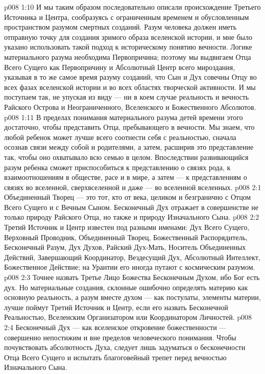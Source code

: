 \vs p008 1:10 \pc И мы таким образом последовательно описали происхождение Третьего Источника и Центра, сообразуясь с ограниченным временем и обусловленным пространством разумом смертных созданий. Разум человека должен иметь отправную точку для создания зримого образа вселенской истории, и мне было указано использовать такой подход к историческому понятию вечности. Логике материального разума необходима Первопричина; поэтому мы выдвигаем Отца Всего Сущего как Первопричину и Абсолютный Центр всего мироздания, указывая в то же самое время разуму созданий, что Сын и Дух совечны Отцу во всех фазах вселенской истории и во всех областях творческой активности. И мы поступаем так, не упуская из виду --- ни в коем случае реальность и вечность Райского Острова и Неограниченного, Вселенского и Божественного Абсолютов.
\vs p008 1:11 В пределах понимания материального разума детей времени этого достаточно, чтобы представить Отца, пребывающего в вечности. Мы знаем, что любой ребенок может лучше всего соотнести себя с реальностью, сначала осознав связи между собой и родителями, а затем, расширив это представление так, чтобы оно охватывало всю семью в целом. Впоследствии развивающийся разум ребенка сможет приспособиться к представлению о связях рода, к взаимоотношениям в обществе, расе и в мире, а затем --- к представлениям о связях во вселенной, сверхвселенной и даже --- во вселенной вселенных.
\vs p008 2:1 Объединенный Творец --- это тот, кто от века, целиком и безгранично с Отцом Всего Сущего и с Вечным Сыном. Бесконечный Дух отражает в совершенстве не только природу Райского Отца, но также и природу Изначального Сына.
\vs p008 2:2 \pc Третий Источник и Центр известен под разными именами: Дух Всего Сущего, Верховный Проводник, Объединенный Творец, Божественный Распорядитель, Бесконечный Разум, Дух Духов, Райский Дух\hyp{}Мать, Носитель Объединенных Действий, Завершающий Координатор, Вездесущий Дух, Абсолютный Интеллект, Божественное Действие; на Урантии его иногда путают с космическим разумом.
\vs p008 2:3 Точнее назвать Третье Лицо Божества Бесконечным Духом, ибо Бог есть дух. Но материальные создания, склонные ошибочно определять материю как основную реальность, а разум вместе духом --- как постулаты, элементы материи, лучше поймут Третий Источник и Центр, если его назвать Бесконечной Реальностью, Вселенским Организатором или Координатором Личностей.
\vs p008 2:4 \pc Бесконечный Дух --- как вселенское откровение божественности --- совершенно непостижим и вне пределов человеческого понимания. Чтобы почувствовать абсолютность Духа, следует лишь задуматься о бесконечности Отца Всего Сущего и испытать благоговейный трепет перед вечностью Изначального Сына.
